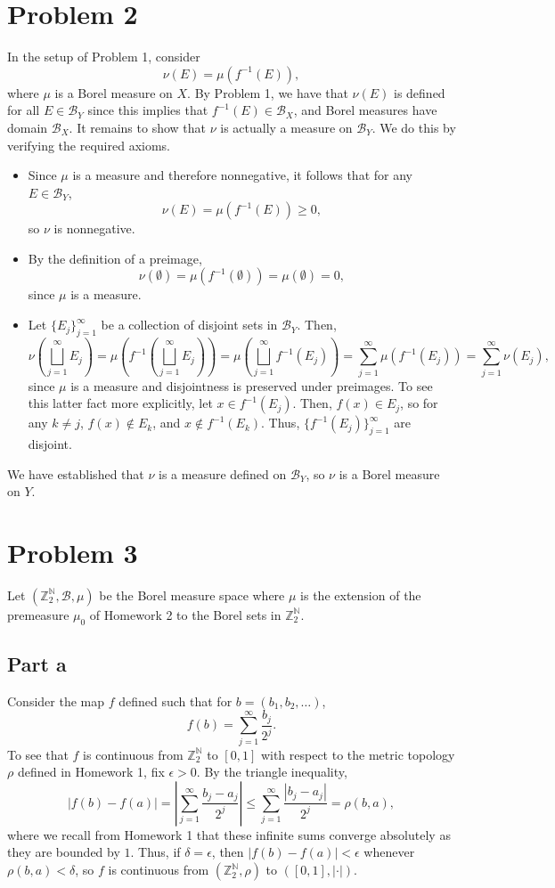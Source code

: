 \documentclass{article}
\begin{document}
\section{Problem 2}
In the setup of Problem 1, consider
\[
\nu(E)=\mu\left(f^{-1}(E)\right),
\]
where $\mu$ is a Borel measure on $X$. By Problem 1, we have that $\nu(E)$ is defined for all $E\in\mathcal B_Y$ since this implies that $f^{-1}(E)\in\mathcal B_X$, and Borel measures have domain $\mathcal B_X$. It remains to show that $\nu$ is actually a measure on $\mathcal B_Y$. We do this by verifying the required axioms.
\begin{itemize}
	\item Since $\mu$ is a measure and therefore nonnegative, it follows that for any $E\in\mathcal B_Y$,
	\[
	\nu(E)=\mu\left(f^{-1}(E)\right)\geq0,
	\]
	so $\nu$ is nonnegative.
	\item By the definition of a preimage,
	\[
	\nu(\emptyset)=\mu\left(f^{-1}(\emptyset)\right)=\mu(\emptyset)=0,
	\]
	since $\mu$ is a measure. 
	\item Let $\{E_j\}_{j=1}^\infty$ be a collection of disjoint sets in $\mathcal B_Y$. Then, 
	\[
	\nu\left(\bigsqcup_{j=1}^\infty E_j\right)=\mu\left(f^{-1}\left(\bigsqcup_{j=1}^\infty E_j\right)\right)=\mu\left(\bigsqcup_{j=1}^\infty f^{-1}(E_j)\right)=\sum_{j=1}^\infty \mu\left(f^{-1}(E_j)\right)=\sum_{j=1}^\infty\nu(E_j),
	\]
	since $\mu$ is a measure and disjointness is preserved under preimages. To see this latter fact more explicitly, let $x\in f^{-1}(E_j)$. Then, $f(x)\in E_j$, so for any $k\neq j$, $f(x)\notin E_k$, and $x\notin f^{-1}(E_k)$. Thus, $\{f^{-1}(E_j)\}_{j=1}^\infty$ are disjoint. 
\end{itemize}
We have established that $\nu$ is a measure defined on $\mathcal B_Y$, so $\nu$ is a Borel measure on $Y$. 

\section{Problem 3}
Let $(\mathbb{Z}_2^\mathbb{N},\mathcal B,\mu)$ be the Borel measure space where $\mu$ is the extension of the premeasure $\mu_0$ of Homework 2 to the Borel sets in $\mathbb{Z}_2^\mathbb{N}$.

\subsection{Part a}
Consider the map $f$ defined such that for $b=(b_1,b_2,\ldots)$, 
\[
f(b)=\sum_{j=1}^\infty\frac{b_j}{2^j}.
\] 
To see that $f$ is continuous from $\mathbb{Z}_2^\mathbb{N}$ to $[0,1]$ with respect to the metric topology $\rho$ defined in Homework 1, fix $\epsilon>0$. By the triangle inequality,
\[
|f(b)-f(a)|=\left|\sum_{j=1}^\infty\frac{b_j-a_j}{2^j}\right|\leq\sum_{j=1}^\infty\frac{|b_j-a_j|}{2^j}=\rho(b,a),
\]
where we recall from Homework 1 that these infinite sums converge absolutely as they are bounded by $1$. Thus, if $\delta=\epsilon$, then $|f(b)-f(a)|<\epsilon$ whenever $\rho(b,a)<\delta$, so $f$ is continuous from $(\mathbb{Z}_2^\mathbb{N},\rho)$ to $\left([0,1],|\cdot|\right)$.
\end{document}
